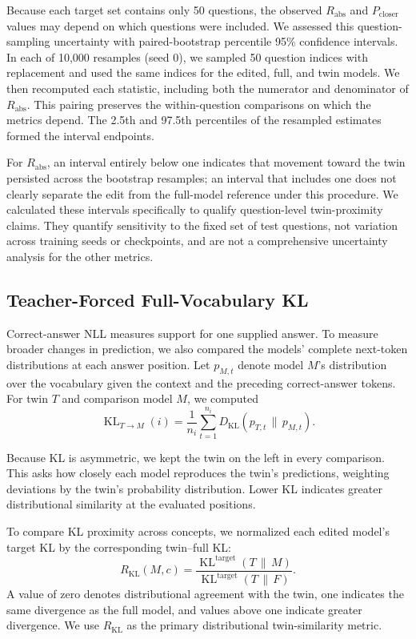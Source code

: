 Because each target set contains only 50 questions, the observed
$R_{\mathrm{abs}}$ and $P_{\mathrm{closer}}$ values may depend on which
questions were included. We assessed this question-sampling uncertainty with
paired-bootstrap percentile 95\% confidence intervals. In each of 10,000
resamples (seed 0), we sampled 50 question indices with replacement and used
the same indices for the edited, full, and twin models. We then recomputed each
statistic, including both the numerator and denominator of
$R_{\mathrm{abs}}$. This pairing preserves the within-question comparisons on
which the metrics depend. The 2.5th and 97.5th percentiles of the resampled
estimates formed the interval endpoints.

For $R_{\mathrm{abs}}$, an interval entirely below one indicates that movement
toward the twin persisted across the bootstrap resamples; an interval that
includes one does not clearly separate the edit from the full-model reference
under this procedure. We calculated these intervals specifically to qualify
question-level twin-proximity claims. They quantify sensitivity to the fixed
set of test questions, not variation across training seeds or checkpoints, and
are not a comprehensive uncertainty analysis for the other metrics.

\subsection{Teacher-Forced Full-Vocabulary KL}

Correct-answer NLL measures support for one supplied answer. To measure broader
changes in prediction, we also compared the models' complete next-token
distributions at each answer position. Let $p_{M,t}$ denote model $M$'s
distribution over the vocabulary given the context and the preceding
correct-answer tokens. For twin $T$ and comparison model $M$, we computed
\begin{equation}
\operatorname{KL}_{T\to M}(i)
=
\frac{1}{n_i}
\sum_{t=1}^{n_i}
D_{\mathrm{KL}}
\left(
p_{T,t}\,\|\,p_{M,t}
\right).
\end{equation}

Because KL is asymmetric, we kept the twin on the left in every comparison.
This asks how closely each model reproduces the twin's predictions, weighting
deviations by the twin's probability distribution. Lower KL indicates greater
distributional similarity at the evaluated positions.

To compare KL proximity across concepts, we normalized each edited model's
target KL by the corresponding twin--full KL:
\begin{equation}
R_{\mathrm{KL}}(M,c)
=
\frac{
\operatorname{KL}^{\mathrm{target}}(T\,\|\,M)
}{
\operatorname{KL}^{\mathrm{target}}(T\,\|\,F)
}.
\end{equation}
A value of zero denotes distributional agreement with the twin, one indicates
the same divergence as the full model, and values above one indicate greater
divergence. We use $R_{\mathrm{KL}}$ as the primary distributional
twin-similarity metric.

